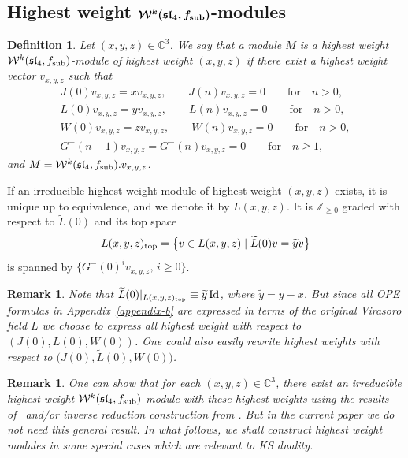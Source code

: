 \documentclass[pdftex]{sigma}
\numberwithin{equation}{section}
\newcommand{\Z}{\mathbb Z}
\newtheorem{Definition}[Theorem]{Definition}
\newtheorem{Remark}[Theorem]{Remark}
\begin{document}
\subsection[Highest weight W\^{}k(sl\_4, f\_sub)-modules]{Highest weight $\boldsymbol{\mathcal W^k(\mathfrak{sl}_4, f_{\rm sub})}$-modules}

\begin{Definition} Let $(x,y,z) \in \mathbb{C}^3$. We say that a module $M$ is a highest weight $ \mathcal{W}^k(\mathfrak{sl}_4, f_{\rm sub})$-module of highest weight $(x,y,z)$ if there exist a highest weight vector $v_{x,y,z}$ such that
\begin{gather*}
 J(0)v_{x,y,z} = x v_{x,y,z}, \qquad J(n)v_{x,y,z} = 0 \qquad \text{for} \quad n>0, \\
 L(0)v_{x,y,z} = y v_{x,y,z}, \qquad L(n)v_{x,y,z} = 0 \qquad \text{for} \quad n>0, \\
 W(0)v_{x,y,z} = z v_{x,y,z}, \qquad W(n)v_{x,y,z} = 0 \qquad \text{for}\quad n>0, \\
 G^{+}(n-1)v_{x,y,z} = G^{-}(n)v_{x,y,z} =0 \qquad \text{for} \quad n\geq 1,
\end{gather*}
and $M= \mathcal{W}^k(\mathfrak{sl}_4, f_{\rm sub}). v_{x,y,z}$.
\end{Definition}

 If an irreducible highest weight module of highest weight $(x,y,z)$ exists, it is unique up to equivalence, and we denote it by $L(x,y,z)$.
 It is ${\Z}_{\ge 0}$ graded with respect to $\widetilde L(0)$ and its top space
 \[
 L(x,y,z)_{\text{\rm top}} = \big\lbrace v \in L(x,y,z) \mid \widetilde L(0)v = \widetilde y v \big\rbrace \]
 is spanned by $ \big\{G^-(0)^iv_{x,y,z}, \, i \geq 0 \big\}$.

 \begin{Remark} Note that $\widetilde L(0) \vert_{ L(x,y,z)_{\text{\rm top}}} \equiv \widetilde y \operatorname{Id}$, where $\widetilde y = y-x$. But since all OPE formulas in Appendix~\ref{appendix-b} are expressed in terms of the original Virasoro field $L$ we choose to express all highest weight with respect to
 $(J(0), L(0), W(0))$. One could also easily rewrite highest weights with respect to $\bigl(J(0), \widetilde L(0), W(0)\bigr)$.
\end{Remark}

\begin{Remark} One can show that for each $(x,y,z) \in \mathbb{C}^3$, there exist an irreducible highest weight $ \mathcal{W}^k(\mathfrak{sl}_4, f_{\rm sub})$-module with these highest weights using the results of~\cite{KW} and/or inverse reduction construction from \cite{Feh}. But in the current paper we do not need this general result. In what follows, we shall construct highest weight modules in some special cases which are relevant to KS duality.
\end{Remark}
\end{document}
